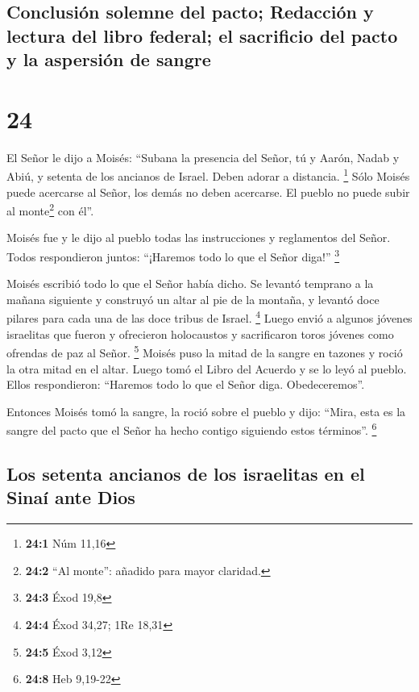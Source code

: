 \hypertarget{conclusiuxf3n-solemne-del-pacto-redacciuxf3n-y-lectura-del-libro-federal-el-sacrificio-del-pacto-y-la-aspersiuxf3n-de-sangre}{%
\subsection{Conclusión solemne del pacto; Redacción y lectura del libro
federal; el sacrificio del pacto y la aspersión de
sangre}\label{conclusiuxf3n-solemne-del-pacto-redacciuxf3n-y-lectura-del-libro-federal-el-sacrificio-del-pacto-y-la-aspersiuxf3n-de-sangre}}

\hypertarget{section-23}{%
\section{24}\label{section-23}}

 El Señor le dijo a Moisés: ``Subana la presencia del
Señor, tú y Aarón, Nadab y Abiú, y setenta de los ancianos de Israel.
Deben adorar a distancia. \footnote{\textbf{24:1} Núm 11,16}
 Sólo Moisés puede acercarse al Señor, los demás no deben
acercarse. El pueblo no puede subir al monte\footnote{\textbf{24:2} ``Al
  monte'': añadido para mayor claridad.} con él''.

 Moisés fue y le dijo al pueblo todas las instrucciones y
reglamentos del Señor. Todos respondieron juntos: ``¡Haremos todo lo que
el Señor diga!'' \footnote{\textbf{24:3} Éxod 19,8}

 Moisés escribió todo lo que el Señor había dicho. Se
levantó temprano a la mañana siguiente y construyó un altar al pie de la
montaña, y levantó doce pilares para cada una de las doce tribus de
Israel. \footnote{\textbf{24:4} Éxod 34,27; 1Re 18,31} 
Luego envió a algunos jóvenes israelitas que fueron y ofrecieron
holocaustos y sacrificaron toros jóvenes como ofrendas de paz al Señor.
\footnote{\textbf{24:5} Éxod 3,12}  Moisés puso la mitad
de la sangre en tazones y roció la otra mitad en el altar.
 Luego tomó el Libro del Acuerdo y se lo leyó al pueblo.
Ellos respondieron: ``Haremos todo lo que el Señor diga. Obedeceremos''.

 Entonces Moisés tomó la sangre, la roció sobre el pueblo
y dijo: ``Mira, esta es la sangre del pacto que el Señor ha hecho
contigo siguiendo estos términos''. \footnote{\textbf{24:8} Heb 9,19-22}

\hypertarget{los-setenta-ancianos-de-los-israelitas-en-el-sinauxed-ante-dios}{%
\subsection{Los setenta ancianos de los israelitas en el Sinaí ante
Dios}\label{los-setenta-ancianos-de-los-israelitas-en-el-sinauxed-ante-dios}}

